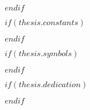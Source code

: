 

$endif$

$if(thesis.constants)$



$endif$

$if(thesis.symbols)$



$endif$

$if(thesis.dedication)$

\dedicatory{} 

$endif$


\mainmatter %

\pagestyle{thesis} %
